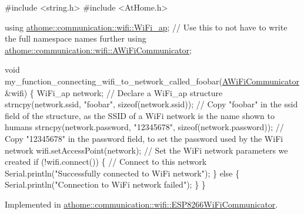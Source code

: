 \begin{DoxyCode}
\textcolor{preprocessor}{#include <string.h>}
\textcolor{preprocessor}{#include <AtHome.h>}

\textcolor{keyword}{using} \mbox{\hyperlink{structathome_1_1communication_1_1wifi_1_1s__wifi__access__point}{athome::communication::wifi::WiFi\_ap}}; \textcolor{comment}{// Use this to not have to
       write the full namespace names further}
\textcolor{keyword}{using} \mbox{\hyperlink{classathome_1_1communication_1_1wifi_1_1_a_wi_fi_communicator}{athome::communication::wifi::AWiFiCommunicator}};

\textcolor{keywordtype}{void} my\_function\_connecting\_wifi\_to\_network\_called\_foobar(\mbox{\hyperlink{classathome_1_1communication_1_1wifi_1_1_a_wi_fi_communicator_a0098148fe8d0eeee99b7f8f72a72a900}{AWiFiCommunicator}} &wifi) \{
  WiFi\_ap network; \textcolor{comment}{// Declare a WiFi\_ap structure}
  strncpy(network.ssid, \textcolor{stringliteral}{"foobar"}, \textcolor{keyword}{sizeof}(network.ssid)); \textcolor{comment}{// Copy "foobar" in the ssid field of the
       structure, as the SSID of a WiFi network is the name shown to humans}
  strncpy(network.password, \textcolor{stringliteral}{"12345678"}, \textcolor{keyword}{sizeof}(network.password)); \textcolor{comment}{// Copy "12345678" in the password
       field, to set the password used by the WiFi network}
  wifi.setAccessPoint(network); \textcolor{comment}{// Set the WiFi network parameters we created}
  \textcolor{keywordflow}{if} (!wifi.connect()) \{ \textcolor{comment}{// Connect to this network}
    Serial.println(\textcolor{stringliteral}{"Successfully connected to WiFi network"});
  \} \textcolor{keywordflow}{else} \{
    Serial.println(\textcolor{stringliteral}{"Connection to WiFi network failed"});
  \}
\}
\end{DoxyCode}
 

Implemented in \mbox{\hyperlink{classathome_1_1communication_1_1wifi_1_1_e_s_p8266_wi_fi_communicator_a58cc439be2f368b346bbbe1601a9b675}{athome\+::communication\+::wifi\+::\+E\+S\+P8266\+Wi\+Fi\+Communicator}}.

\mbox{\label{classathome_1_1communication_1_1wifi_1_1_a_wi_fi_communicator_ac81395d55c9a6824136d7b63fdb096f0}} 

